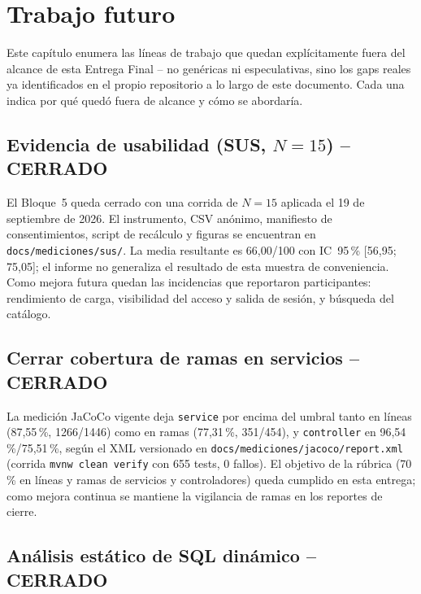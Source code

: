 \chapter{Trabajo futuro}
\label{cap:trabajo-futuro}

Este capítulo enumera las líneas de trabajo que quedan explícitamente
fuera del alcance de esta Entrega Final -- no genéricas ni especulativas,
sino los gaps reales ya identificados en el propio repositorio a lo largo
de este documento. Cada una indica por qué quedó fuera de alcance y cómo
se abordaría.

\section{Evidencia de usabilidad (SUS, $N=15$) -- CERRADO}
\label{sec:tf-sus}

El Bloque~5 queda cerrado con una corrida de $N=15$ aplicada el 19 de
septiembre de 2026. El instrumento, CSV anónimo, manifiesto de
consentimientos, script de recálculo y figuras se encuentran en
\texttt{docs/mediciones/sus/}. La media resultante es 66,00/100 con
IC~95\,\% [56,95; 75,05]; el informe no generaliza el resultado de esta
muestra de conveniencia. Como mejora futura quedan las incidencias que
reportaron participantes: rendimiento de carga, visibilidad del acceso y
salida de sesión, y búsqueda del catálogo.

\section{Cerrar cobertura de ramas en servicios -- CERRADO}
\label{sec:tf-service-branch-coverage}

La medición JaCoCo vigente deja \texttt{service} por encima del umbral
tanto en líneas (87,55\,\%, 1266/1446) como en ramas (77,31\,\%,
351/454), y \texttt{controller} en 96,54\,\%/75,51\,\%, según el XML
versionado en \texttt{docs/mediciones/jacoco/report.xml} (corrida
\texttt{mvnw clean verify} con 655 tests, 0 fallos). El objetivo de la
rúbrica (70\,\% en líneas y ramas de servicios y controladores) queda
cumplido en esta entrega; como mejora continua se mantiene la vigilancia
de ramas en los reportes de cierre.

\section{Análisis estático de SQL dinámico -- CERRADO}

